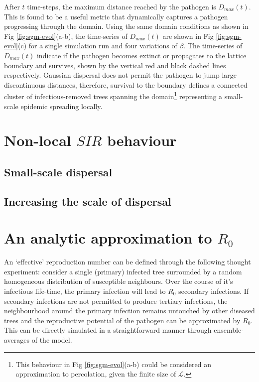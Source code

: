 After $t$ time-steps, the maximum distance reached by the pathogen is $D_{max}(t)$. This is found to be a useful metric that dynamically captures a pathogen progressing through the domain. Using the same domain conditions as shown in Fig \ref{fig:sgm-evol}(a-b), the time-series of $D_{max}(t)$ are shown in Fig \ref{fig:sgm-evol}(c) for a single simulation run and four variations of $\beta$. The time-series of $D_{max}(t)$ indicate if the pathogen becomes extinct or propagates to the lattice boundary and survives, shown by the vertical red and black dashed lines respectively. Gaussian dispersal does not permit the pathogen to jump large discontinuous distances, therefore, survival to the boundary defines a connected cluster of infectious-removed trees spanning the domain\footnote{This behaviour in Fig \ref{fig:sgm-evol}(a-b) could be considered an approximation to percolation, given the finite size of $\mathcal{L}$.} representing a small-scale epidemic spreading locally.\\

\section{Non-local $SIR$ behaviour}

\blindtext

\subsection{Small-scale dispersal}

\blindtext %

\subsection{Increasing the scale of dispersal}

\blindtext

\blindtext


\section{An analytic approximation to $R_0$}

An `effective' reproduction number can be defined through the following thought experiment: consider a single (primary) infected tree surrounded by a random homogeneous distribution of susceptible neighbours. Over the course of it's infectious life-time, the primary infection will lead to $R_0$ secondary infections. If secondary infections are not permitted to produce tertiary infections, the neighbourhood around the primary infection remains untouched by other diseased trees and the reproductive potential of the pathogen can be approximated by $R_0$. This can be directly simulated in a straightforward manner through ensemble-averages of the model.\\

